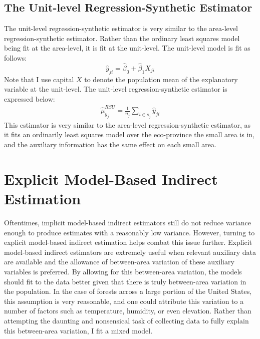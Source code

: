 \documentclass[12pt,twoside]{reedthesis}
\begin{document}
\hypertarget{the-unit-level-regression-synthetic-estimator}{%
\subsection{The Unit-level Regression-Synthetic Estimator}\label{the-unit-level-regression-synthetic-estimator}}

The unit-level regression-synthetic estimator is very similar to the area-level regression-synthetic estimator. Rather than the ordinary least squares model being fit at the area-level, it is fit at the unit-level. The unit-level model is fit as follows:
\[
\hat y_{ji} = \hat\beta_0 + \hat\beta_1 X_{ji}
\]
Note that I use capital \(X\) to denote the population mean of the explanatory variable at the unit-level. The unit-level regression-synthetic estimator is expressed below:
\begin{align}
\hat\mu_{y_j}^{RSU} = \frac{1}{n_j} \sum_{i \in s_j} \hat y_{ji}
\end{align}
This estimator is very similar to the area-level regression-synthetic estimator, as it fits an ordinarily least squares model over the eco-province the small area is in, and the auxiliary information has the same effect on each small area.

\hypertarget{explicit-model-based-indirect-estimation}{%
\section{Explicit Model-Based Indirect Estimation}\label{explicit-model-based-indirect-estimation}}

Oftentimes, implicit model-based indirect estimators still do not reduce variance enough to produce estimates with a reasonably low variance. However, turning to explicit model-based indirect estimation helps combat this issue further. Explicit model-based indirect estimators are extremely useful when relevant auxiliary data are available and the allowance of between-area variation of these auxiliary variables is preferred. By allowing for this between-area variation, the models should fit to the data better given that there is truly between-area variation in the population. In the case of forests across a large portion of the United States, this assumption is very reasonable, and one could attribute this variation to a number of factors such as temperature, humidity, or even elevation. Rather than attempting the daunting and nonsensical task of collecting data to fully explain this between-area variation, I fit a mixed model.
\end{document}
